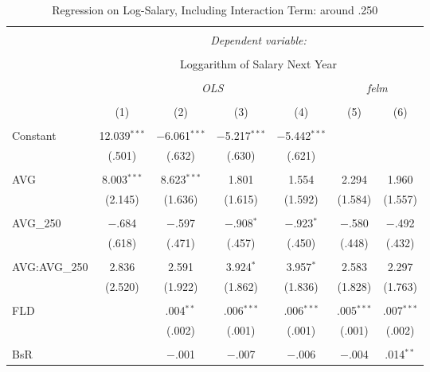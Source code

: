 
\begin{table}[H] \centering
  \caption{Regression on Log-Salary, Including Interaction Term: around .250}
  \label{AVG250_A}
\tiny
\begin{tabular}{@{\extracolsep{5pt}}lcccccc}
\\[-1.8ex]\hline
\hline \\[-1.8ex]
 & \multicolumn{6}{c}{\textit{Dependent variable:}} \\
\cline{2-7}
\\[-1.8ex] & \multicolumn{6}{c}{Loggarithm of Salary Next Year} \\
\\[-1.8ex] & \multicolumn{4}{c}{\textit{OLS}} & \multicolumn{2}{c}{\textit{felm}} \\
\\[-1.8ex] & (1) & (2) & (3) & (4) & (5) & (6)\\
\hline \\[-1.8ex]
 Constant & 12.039$^{***}$ & $-$6.061$^{***}$ & $-$5.217$^{***}$ & $-$5.442$^{***}$ &  &  \\
  & (.501) & (.632) & (.630) & (.621) &  &  \\
  & & & & & & \\
 AVG & 8.003$^{***}$ & 8.623$^{***}$ & 1.801 & 1.554 & 2.294 & 1.960 \\
  & (2.145) & (1.636) & (1.615) & (1.592) & (1.584) & (1.557) \\
  & & & & & & \\
 AVG\_250 & $-$.684 & $-$.597 & $-$.908$^{*}$ & $-$.923$^{*}$ & $-$.580 & $-$.492 \\
  & (.618) & (.471) & (.457) & (.450) & (.448) & (.432) \\
  & & & & & & \\
  AVG:AVG\_250 & 2.836 & 2.591 & 3.924$^{*}$ & 3.957$^{*}$ & 2.583 & 2.297 \\
  & (2.520) & (1.922) & (1.862) & (1.836) & (1.828) & (1.763) \\
  & & & & & & \\
 FLD &  & .004$^{**}$ & .006$^{***}$ & .006$^{***}$ & .005$^{***}$ & .007$^{***}$ \\
  &  & (.002) & (.001) & (.001) & (.001) & (.002) \\
  & & & & & & \\
 BsR &  & $-$.001 & $-$.007 & $-$.006 & $-$.004 & .014$^{**}$ \\

\end{tabular}
\end{table}
